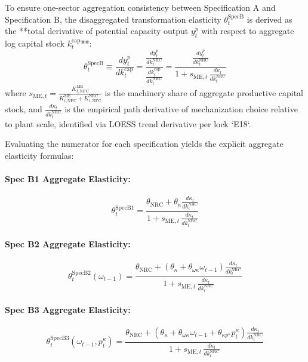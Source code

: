 \documentclass[11pt,a4paper]{article}
\begin{document}
To ensure one-sector aggregation consistency between Specification A and Specification B, the disaggregated transformation elasticity $\theta_t^{\text{SpecB}}$ is derived as the **total derivative of potential capacity output $y_t^p$ with respect to aggregate log capital stock $k_t^{\text{cap}}$**:
\begin{equation}
\theta_t^{\text{SpecB}} \equiv \frac{d y_t^p}{d k_t^{\text{cap}}} = \frac{\frac{d y_t^p}{d k_t^{\text{NRC}}}}{\frac{d k_t^{\text{cap}}}{d k_t^{\text{NRC}}}} = \frac{\frac{d y_t^p}{d k_t^{\text{NRC}}}}{1 + s_{\text{ME}, t} \, \frac{d \kappa_t}{d k_t^{\text{NRC}}}}
\end{equation}
where $s_{\text{ME}, t} = \frac{K_{t, \text{NFC}}^{\text{ME}}}{K_{t, \text{NFC}}^{\text{ME}} + K_{t, \text{NFC}}^{\text{NRC}}}$ is the machinery share of aggregate productive capital stock, and $\frac{d \kappa_t}{d k_t^{\text{NRC}}}$ is the empirical path derivative of mechanization choice relative to plant scale, identified via LOESS trend derivative per lock `E18`.

Evaluating the numerator for each specification yields the explicit aggregate elasticity formulas:

\paragraph{Spec B1 Aggregate Elasticity:}
\begin{equation}
\theta_{t}^{\text{SpecB1}} = \frac{\theta_{\text{NRC}} + \theta_{\kappa} \frac{d \kappa_t}{d k_t^{\text{NRC}}}}{1 + s_{\text{ME}, t} \, \frac{d \kappa_t}{d k_t^{\text{NRC}}}}
\end{equation}

\paragraph{Spec B2 Aggregate Elasticity:}
\begin{equation}
\theta_{t}^{\text{SpecB2}}(\omega_{t-1}) = \frac{\theta_{\text{NRC}} + \left( \theta_{\kappa} + \theta_{\omega \kappa} \omega_{t-1} \right) \frac{d \kappa_t}{d k_t^{\text{NRC}}}}{1 + s_{\text{ME}, t} \, \frac{d \kappa_t}{d k_t^{\text{NRC}}}}
\end{equation}

\paragraph{Spec B3 Aggregate Elasticity:}
\begin{equation}
\theta_{t}^{\text{SpecB3}}(\omega_{t-1}, p_t^{\kappa}) = \frac{\theta_{\text{NRC}} + \left( \theta_{\kappa} + \theta_{\omega \kappa} \omega_{t-1} + \theta_{\kappa p^{\kappa}} p_t^{\kappa} \right) \frac{d \kappa_t}{d k_t^{\text{NRC}}}}{1 + s_{\text{ME}, t} \, \frac{d \kappa_t}{d k_t^{\text{NRC}}}}
\end{equation}
\end{document}
